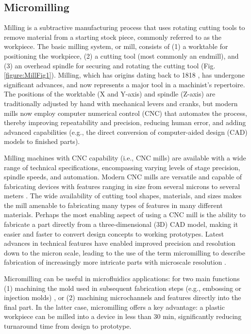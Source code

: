 \subsection{Micromilling}
Milling is a subtractive manufacturing process that uses rotating cutting tools to remove material from a starting stock piece, commonly referred to as the workpiece. The basic milling system, or mill, consists of (1) a worktable for positioning the workpiece, (2) a cutting tool (most commonly an endmill), and (3) an overhead spindle for securing and rotating the cutting tool (Fig. \ref{figure:MillFig1}). Milling, which has origins dating back to 1818 \cite{Woodbury1974}, has undergone significant advances, and now represents a major tool in a machinist's repertoire. The positions of the worktable (X and Y-axis) and spindle (Z-axis) are traditionally adjusted by hand with mechanical levers and cranks, but modern mills now employ computer numerical control (CNC) that automates the process, thereby improving repeatability and precision, reducing human error, and adding advanced capabilities (e.g., the direct conversion of computer-aided design (CAD) models to finished parts). 

Milling machines with CNC capability (i.e., CNC mills) are available with a wide range of technical specifications, encompassing varying levels of stage precision, spindle speeds, and automation. Modern CNC mills are versatile and capable of fabricating devices with features ranging in size from several microns to several meters \cite{Auric2012}. The wide availability of cutting tool shapes, materials, and sizes \cite{Friedrich1996a} makes the mill amenable to fabricating many types of features in many different materials. Perhaps the most enabling aspect of using a CNC mill is the ability to fabricate a part directly from a three-dimensional (3D) CAD model, making it easier and faster to convert design concepts to working prototypes. Latest advances in technical features have enabled improved precision and resolution down to the micron scale, leading to the use of the term micromilling to describe fabrication of increasingly more intricate parts with microscale resolution \cite{Bang2005}. 

Micromilling can be useful in microfluidics applications: for two main functions (1) machining the mold used in subsequent fabrication steps (e.g., embossing or injection molds) \cite{Wilson2011,Okagbare2010}, or (2) machining microchannels and features directly into the final part. In the latter case, micromilling offers a key advantage: a plastic workpiece can be milled into a device in less than 30 min, significantly reducing turnaround time from design to prototype. 


